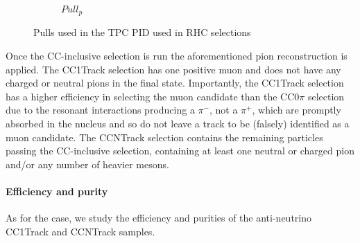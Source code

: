 \begin{figure}[h]
\begin{subfigure}[t]{0.32\textwidth}
		\caption{$Pull_p$}
	\end{subfigure}
	\caption{Pulls used in the TPC PID used in \numubar RHC selections}
	\label{fig:numubar_pulls}
\end{figure}

Once the \numubar CC-inclusive selection is run the aforementioned pion reconstruction is applied. The \numubar CC1Track selection has one positive muon and does not have any charged or neutral pions in the final state. Importantly, the \numubar CC1Track selection has a higher efficiency in selecting the muon candidate than the \numu CC0$\pi$ selection due to the \numubar resonant interactions producing a $\pi^-$, not a $\pi^+$, which are promptly absorbed in the nucleus and so do not leave a track to be (falsely) identified as a muon candidate. The \numubar CCNTrack selection contains the remaining particles passing the \numubar CC-inclusive selection, containing at least one neutral or charged pion and/or any number of heavier mesons.

\paragraph{Efficiency and purity}
As for the \numu case, we study the efficiency and purities of the anti-neutrino CC1Track and CCNTrack samples.

